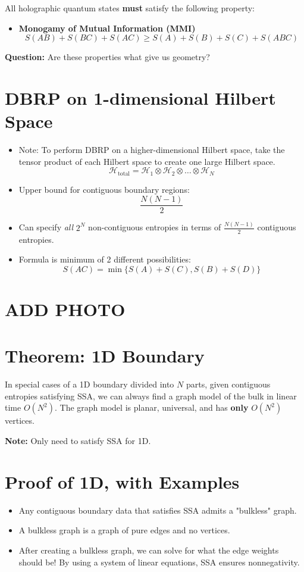 \documentclass{article}
\begin{document}
All holographic quantum states \textbf{must} satisfy the following property:
\begin{itemize}
    \item \textbf{Monogamy of Mutual Information (MMI)}
    \[
    S(AB) + S(BC) + S(AC) \geq S(A) + S(B) + S(C) + S(ABC)
    \]
\end{itemize}

\textbf{Question:} Are these properties what give us geometry?

\section{DBRP on 1-dimensional Hilbert Space}
\begin{itemize}
    \item Note: To perform DBRP on a higher-dimensional Hilbert space, take the tensor product of each Hilbert space to create one large Hilbert space.
    \[
    \mathcal{H}_{\text{total}} = \mathcal{H}_1 \otimes \mathcal{H}_2 \otimes \dots \otimes \mathcal{H}_N
    \]
    \item Upper bound for contiguous boundary regions: 
    \[
    \frac{N(N-1)}{2}
    \]
    \item Can specify \textit{all} \( 2^N \) non-contiguous entropies in terms of \( \frac{N(N-1)}{2} \) contiguous entropies.
    \item Formula is minimum of 2 different possibilities:
    \[
    S(AC) = \min\{ S(A) + S(C), S(B) + S(D) \}
    \]
\end{itemize}
\section{ADD PHOTO}

\section{Theorem: 1D Boundary}
In special cases of a 1D boundary divided into \( N \) parts, given contiguous entropies satisfying SSA, we can always find a graph model of the bulk in linear time \( O(N^2) \). The graph model is planar, universal, and has \textbf{only} \( O(N^2) \) vertices.

\textbf{Note:} Only need to satisfy SSA for 1D.

\section{Proof of 1D, with Examples}
\begin{itemize}
    \item Any contiguous boundary data that satisfies SSA admits a "bulkless" graph.
    \item A bulkless graph is a graph of pure edges and no vertices.
    \item After creating a bulkless graph, we can solve for what the edge weights should be! By using a system of linear equations, SSA ensures nonnegativity.
\end{itemize}
\end{document}
